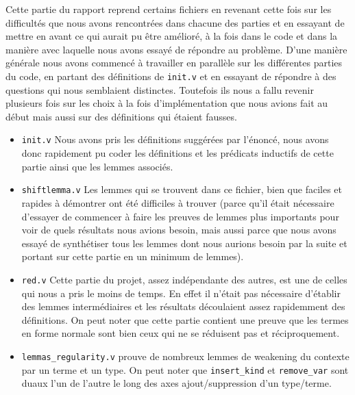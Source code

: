 Cette partie du rapport reprend certains fichiers en revenant cette fois sur les difficultés que nous avons rencontrées dans chacune des parties et en essayant de mettre en avant ce qui aurait pu être amélioré, à la fois dans le code et dans la manière avec laquelle nous avons essayé de répondre au problème. D'une manière générale nous avons commencé à travailler en parallèle sur les différentes parties du code, en partant des définitions de \texttt{init.v} et en essayant de répondre à des questions qui nous semblaient distinctes. Toutefois ils nous a fallu revenir plusieurs fois sur les choix à la fois d'implémentation que nous avions fait au début mais aussi sur des définitions qui étaient fausses.
     \begin{itemize}
      \item \texttt{init.v} Nous avons pris les définitions suggérées par l'énoncé, nous avons donc rapidement pu coder les définitions et les prédicats inductifs de cette partie ainsi que les lemmes associés.
      \item \texttt{shiftlemma.v} Les lemmes qui se trouvent dans ce fichier, bien que faciles et rapides à démontrer ont été difficiles à trouver (parce qu'il était nécessaire d'essayer de commencer à faire les preuves de lemmes plus importants pour voir de quels résultats nous avions besoin, mais aussi parce que nous avons essayé de synthétiser tous les lemmes dont nous aurions besoin par la suite et portant sur cette partie en un minimum de lemmes).
      \item \texttt{red.v} Cette partie du projet, assez indépendante des autres, est une de celles qui nous a pris le moins de temps. En effet il n'était pas nécessaire d'établir des lemmes intermédiaires et les résultats découlaient assez rapidemment des définitions. On peut noter que cette partie contient une preuve que les termes en forme normale sont bien ceux qui ne se réduisent pas et réciproquement.
      \item {\tt lemmas\_regularity.v} prouve de nombreux lemmes de weakening du contexte par un terme et un type. On peut noter que {\tt insert\_kind} et {\tt remove\_var} sont duaux l'un de l'autre le long des axes ajout/suppression d'un type/terme.
     \end{itemize}
